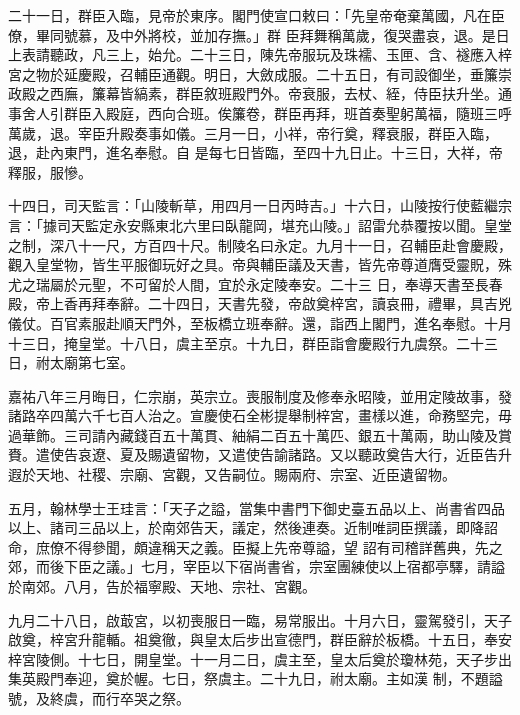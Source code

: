 \begin{pinyinscope}
 二十一日，群臣入臨，見帝於東序。閣門使宣口敕曰：「先皇帝奄棄萬國，凡在臣僚，畢同號慕，及中外將校，並加存撫。」群
 臣拜舞稱萬歲，復哭盡哀，退。是日上表請聽政，凡三上，始允。二十三日，陳先帝服玩及珠襦、玉匣、含、襚應入梓宮之物於延慶殿，召輔臣通觀。明日，大斂成服。二十五日，有司設御坐，垂簾崇政殿之西廡，簾幕皆縞素，群臣敘班殿門外。帝衰服，去杖、絰，侍臣扶升坐。通事舍人引群臣入殿庭，西向合班。俟簾卷，群臣再拜，班首奏聖躬萬福，隨班三呼萬歲，退。宰臣升殿奏事如儀。三月一日，小祥，帝行奠，釋衰服，群臣入臨，退，赴內東門，進名奉慰。自
 是每七日皆臨，至四十九日止。十三日，大祥，帝釋服，服慘。



 十四日，司天監言：「山陵斬草，用四月一日丙時吉。」十六日，山陵按行使藍繼宗言：「據司天監定永安縣東北六里曰臥龍岡，堪充山陵。」詔雷允恭覆按以聞。皇堂之制，深八十一尺，方百四十尺。制陵名曰永定。九月十一日，召輔臣赴會慶殿，觀入皇堂物，皆生平服御玩好之具。帝與輔臣議及天書，皆先帝尊道膺受靈貺，殊尤之瑞屬於元聖，不可留於人間，宜於永定陵奉安。二十三
 日，奉導天書至長春殿，帝上香再拜奉辭。二十四日，天書先發，帝啟奠梓宮，讀哀冊，禮畢，具吉兇儀仗。百官素服赴順天門外，至板橋立班奉辭。還，詣西上閣門，進名奉慰。十月十三日，掩皇堂。十八日，虞主至京。十九日，群臣詣會慶殿行九虞祭。二十三日，祔太廟第七室。



 嘉祐八年三月晦日，仁宗崩，英宗立。喪服制度及修奉永昭陵，並用定陵故事，發諸路卒四萬六千七百人治之。宣慶使石全彬提舉制梓宮，畫樣以進，命務堅完，毋
 過華飾。三司請內藏錢百五十萬貫、紬絹二百五十萬匹、銀五十萬兩，助山陵及賞賚。遣使告哀遼、夏及賜遺留物，又遣使告諭諸路。又以聽政奠告大行，近臣告升遐於天地、社稷、宗廟、宮觀，又告嗣位。賜兩府、宗室、近臣遺留物。



 五月，翰林學士王珪言：「天子之謚，當集中書門下御史臺五品以上、尚書省四品以上、諸司三品以上，於南郊告天，議定，然後連奏。近制唯詞臣撰議，即降詔命，庶僚不得參聞，頗違稱天之義。臣擬上先帝尊謚，望
 詔有司稽詳舊典，先之郊，而後下臣之議。」七月，宰臣以下宿尚書省，宗室團練使以上宿都亭驛，請謚於南郊。八月，告於福寧殿、天地、宗社、宮觀。



 九月二十八日，啟菆宮，以初喪服日一臨，易常服出。十月六日，靈駕發引，天子啟奠，梓宮升龍輴。祖奠徹，與皇太后步出宣德門，群臣辭於板橋。十五日，奉安梓宮陵側。十七日，開皇堂。十一月二日，虞主至，皇太后奠於瓊林苑，天子步出集英殿門奉迎，奠於幄。七日，祭虞主。二十九日，祔太廟。主如漢
 制，不題謚號，及終虞，而行卒哭之祭。




\end{pinyinscope}
